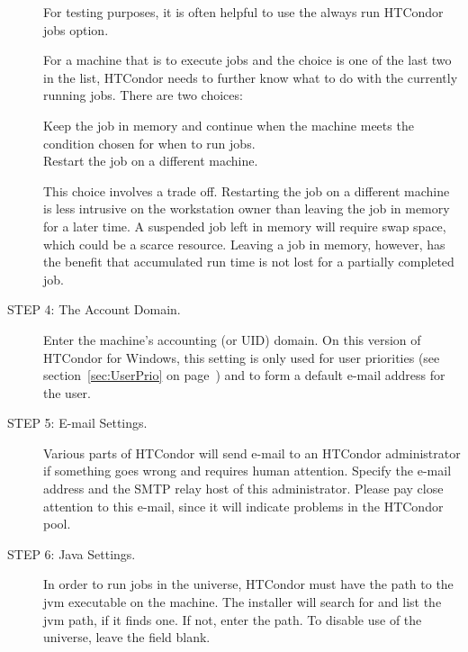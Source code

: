 \begin{description}
     For testing purposes, it is often helpful to use the always run HTCondor
     jobs option. 

     For a machine that is to execute jobs and the choice is one of
the last two in the list,
HTCondor needs to further know what to do with the currently running jobs.
There are two choices:
     \begin{description}
     \item[Keep the job in memory and continue when the machine meets
the condition chosen for when to run jobs.]
     \item[Restart the job on a different machine.]
     \end{description}

     This choice involves a trade off.
     Restarting the job on a different machine is less intrusive
     on the workstation owner than leaving the job in memory for a later time.
     A suspended job left in memory will require swap space,
     which could be a scarce resource.
     Leaving a job in memory, however, has the benefit that accumulated
     run time is not lost for a partially completed job.

\item[STEP 4: The Account Domain.]


     Enter the machine's accounting (or UID) domain.
     On this version of HTCondor for Windows, this setting is only used for user
     priorities (see section~\ref{sec:UserPrio} on
     page~\pageref{sec:UserPrio}) and to form a default e-mail address for
     the user.

\item[STEP 5: E-mail Settings.]

     Various parts of HTCondor will send e-mail to an HTCondor administrator
     if something goes wrong and requires human attention.
     Specify the e-mail address and the SMTP relay host
     of this administrator.  Please pay close attention to this e-mail,
     since it will indicate problems in the HTCondor pool.

\item[STEP 6: Java Settings.]
     In order to run jobs in the  universe,
     HTCondor must have the path to the jvm executable on the machine.
     The installer will search for and list the jvm path, if it finds one.
     If not, enter the path.
     To disable use of the  universe,
     leave the field blank.


\end{description}
